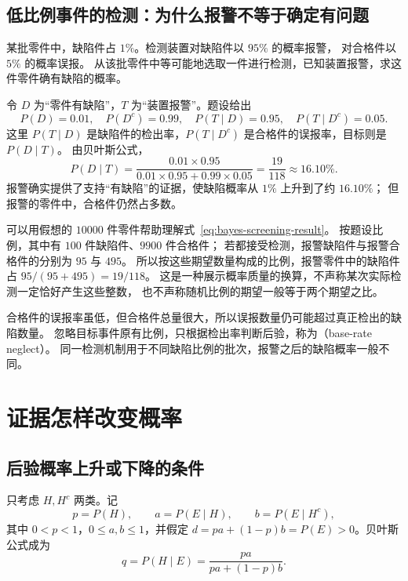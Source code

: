 \documentclass[UTF8]{ctexart}
\begin{document}
\subsection{低比例事件的检测：为什么报警不等于确定有问题}

\begin{example}[自动质检中的误报]
\label{ex:bayes-screening}
某批零件中，缺陷件占 $1\%$。检测装置对缺陷件以 $95\%$ 的概率报警，
对合格件以 $5\%$ 的概率误报。
从该批零件中等可能地选取一件进行检测，已知装置报警，求这件零件确有缺陷的概率。
\end{example}
\begin{solve}
令 $D$ 为“零件有缺陷”，$T$ 为“装置报警”。题设给出
\[
  P(D)=0.01,\quad P(D^c)=0.99,\quad
  P(T\mid D)=0.95,\quad P(T\mid D^c)=0.05.
\]
这里 $P(T\mid D)$ 是缺陷件的检出率，$P(T\mid D^c)$ 是合格件的误报率，目标则是 $P(D\mid T)$。
由贝叶斯公式，
\begin{equation}
  P(D\mid T)
  =\frac{0.01\times0.95}{0.01\times0.95+0.99\times0.05}
  =\frac{19}{118}\approx16.10\%.
  \label{eq:bayes-screening-result}
\end{equation}
报警确实提供了支持“有缺陷”的证据，使缺陷概率从 $1\%$ 上升到了约 $16.10\%$；
但报警的零件中，合格件仍然占多数。
\end{solve}

可以用假想的 $10000$ 件零件帮助理解式~\eqref{eq:bayes-screening-result}。
按题设比例，其中有 $100$ 件缺陷件、$9900$ 件合格件；
若都接受检测，报警缺陷件与报警合格件的分别为 $95$ 与 $495$。
所以按这些期望数量构成的比例，报警零件中的缺陷件占 $95/(95+495)=19/118$。
这是一种展示概率质量的换算，不声称某次实际检测一定恰好产生这些整数，
也不声称随机比例的期望一般等于两个期望之比。

合格件的误报率虽低，但合格件总量很大，所以误报数量仍可能超过真正检出的缺陷数量。
忽略目标事件原有比例，只根据检出率判断后验，称为（base-rate neglect）。
同一检测机制用于不同缺陷比例的批次，报警之后的缺陷概率一般不同。

\section{证据怎样改变概率}
\label{sec:bayes-evidence}

\subsection{后验概率上升或下降的条件}

只考虑 $H,H^c$ 两类。记
\[
  p=P(H),\qquad a=P(E\mid H),\qquad b=P(E\mid H^c),
\]
其中 $0<p<1$，$0\leq a,b\leq1$，并假定
$d=pa+(1-p)b=P(E)>0$。贝叶斯公式成为
\begin{equation}
  q=P(H\mid E)=\frac{pa}{pa+(1-p)b}.
  \label{eq:bayes-binary}
\end{equation}
\end{document}
